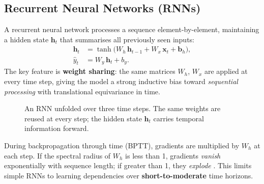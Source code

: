 \subsection*{Recurrent Neural Networks (RNNs)}

A recurrent neural network \cite{Elman1990} processes a sequence element-by-element, maintaining a hidden state $\mathbf{h}_t$ that summarises all previously seen inputs:
\begin{align}
    \mathbf{h}_t &= \tanh\!\bigl(W_h\,\mathbf{h}_{t-1} + W_x\,\mathbf{x}_t + \mathbf{b}_h\bigr), \label{eq:rnn-hidden}\\
    \hat{y}_t &= W_y\,\mathbf{h}_t + b_y. \label{eq:rnn-output}
\end{align}
The key feature is \textbf{weight sharing}: the same matrices $W_h$, $W_x$ are applied at every time step, giving the model a strong inductive bias toward \emph{sequential processing} with translational equivariance in time.

\begin{figure}[h]
\centering
{}
\caption{An RNN unfolded over three time steps. The same weights are reused at every step; the hidden state $\mathbf{h}_t$ carries temporal information forward.}
\label{fig:rnn-unfolded}
\end{figure}

\begin{insightbox}[title={The Vanishing Gradient Problem}]
During backpropagation through time (BPTT), gradients are multiplied by $W_h$ at each step.
If the spectral radius of $W_h$ is less than 1, gradients \emph{vanish} exponentially with sequence length; if greater than 1, they \emph{explode} \cite{VanishingGradient}.
This limits simple RNNs to learning dependencies over \textbf{short-to-moderate} time horizons.
\end{insightbox}

